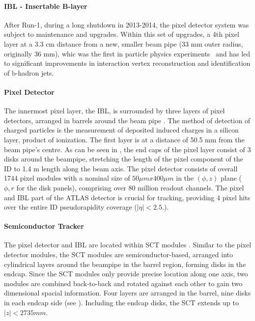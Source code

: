 \paragraph{IBL - Insertable B-layer}
After Run-1, during a long shutdown in 2013-2014, the pixel detector system was subject to maintenance and upgrades. Within this set of upgrades, a 4th pixel layer at a 3.3 cm distance from a new, smaller beam pipe (33 mm outer radius, originally 36 mm), whic was the first in particle physics experiments~\cite{ATLAS-IBL-TDR,ATLAS-IBL-proceedings} and has led to significant improvements in interaction vertex reconstruction and identification of b-hadron jets.


\paragraph{Pixel Detector}
The innermost pixel layer, the IBL, is surrounded by three layers of pixel detectors, arranged in barrels around the beam pipe \cite{ATLAS-Pixel-DesignPerformance,ATLAS-Pixel-Performance-Proceedings}. The method of detection of charged particles is the measurement of deposited induced charges in a silicon layer, product of ionization. The first layer is at a distance of 50.5 mm from the beam pipe's centre. As can be seen in \Fig{\ref{fig:atlas:atlas:atlas_inner_detector:general}}, the end caps of the pixel layer consist of 3 disks around the beampipe, stretching the length of the pixel component of the \ac{ID} to 1.4 m length along the beam axis.  The pixel detector consists of overall 1744 pixel modules with a nominal size of $50 \mu m x 400 \mu m$ in the $(\phi, z)$ plane ($\phi, r$ for the disk panels), comprising over 80 million readout channels.  
The pixel and \ac{IBL} part of the \ac{ATLAS} detector is crucial for tracking, providing 4 pixel hits over the entire \ac{ID} pseudorapidity coverage ($|\eta| < 2.5.$).  

\paragraph{Semiconductor Tracker}
The pixel detector and \ac{IBL} are located within \ac{SCT} modules \cite{ATLAS-SCT}.  
Similar to the pixel detector modules, the \ac{SCT} modules are semiconductor-based, arranged into cylindrical layers around the beampipe in the barrel region, forming disks in the endcap. Since the \ac{SCT} modules only provide precise location along one axis, two modules are combined back-to-back and rotated against each other to gain two dimensional spacial information. Four layers are arranged in the barrel, nine disks in each endcap side (see \Fig{\ref{fig:atlas:atlas:atlas_inner_detector:general}}). Including the endcap disks, the \ac{SCT} extends up to $|z| < 2735 mm$.

